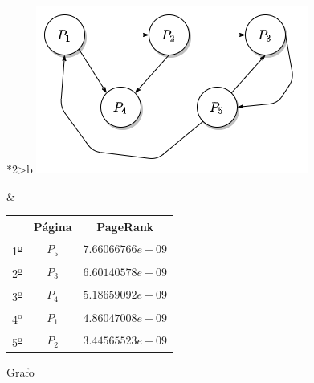 \documentclass[size=a4, parskip=half, titlepage=false, toc=flat, toc=bib, 12pt]{scrartcl}
\theoremstyle{theorem-style}
\theoremstyle{definition-style}
\theoremstyle{remark-style}
\theoremstyle{example-style}
\theoremstyle{definition-style}
\theoremstyle{remark-style}
\begin{document}
\begin{figure}[!ht]
  \begin{tabular}{*{2}{>{\centering\arraybackslash}b{}}}
  \centering
    \includegraphics[scale=0.5]{./img/grafoej7}
    \caption{Grafo}
    &
      \renewcommand{\arraystretch}{1.3}
      \begin{tabular}{ccc}
        & Página & PageRank         \\ \hline
      1\textsuperscript{\underline{o}}} & $P_5$  & $7.66066766e-09$ \\ \hline
      2\textsuperscript{\underline{o}}} & $P_3$  & $6.60140578e-09$ \\ \hline
      3\textsuperscript{\underline{o}}} & $P_4$  & $5.18659092e-09$ \\ \hline
      4\textsuperscript{\underline{o}}} & $P_1$  & $4.86047008e-09$ \\ \hline
      5\textsuperscript{\underline{o}}} & $P_2$  & $3.44565523e-09$ \\ \hline
      \end{tabular}
    \end{tabular}
\end{figure}

\newpage
\end{document}
